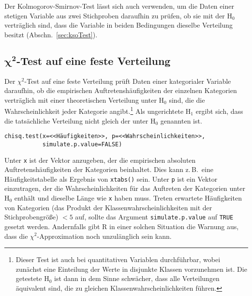 Der Kolmogorov-Smirnov-Test lässt sich auch verwenden, um die Daten einer stetigen Variable aus zwei Stichproben daraufhin zu prüfen, ob sie mit der $\text{H}_{0}$ verträglich sind, dass die Variable in beiden Bedingungen dieselbe Verteilung besitzt (Abschn.\ \ref{sec:ksoTest}).

\subsection[\texorpdfstring{$\chi^{2}$}{chi2}-Test auf eine feste Verteilung]{$\bm{\chi^{2}}$-Test auf eine feste Verteilung}

Der $\chi^{2}$-Test auf eine feste Verteilung prüft Daten einer kategorialer Variable daraufhin, ob die empirischen Auftretenshäufigkeiten der einzelnen Kategorien verträglich mit einer theoretischen Verteilung unter $\text{H}_{0}$ sind, die die Wahrscheinlichkeit jeder Kategorie angibt.\footnote{Dieser Test ist auch bei quantitativen Variablen durchführbar, wobei zunächst eine Einteilung der Werte in disjunkte Klassen vorzunehmen ist. Die getestete $\text{H}_{0}$ ist dann in dem Sinne schwächer, dass alle Verteilungen äquivalent sind, die zu gleichen Klassenwahrscheinlichkeiten führen.} Als ungerichtete $\text{H}_{1}$ ergibt sich, dass die tatsächliche Verteilung nicht gleich der unter $\text{H}_{0}$ genannten ist.
\begin{lstlisting}
chisq.test(x=<<Häufigkeiten>>, p=<<Wahrscheinlichkeiten>>,
           simulate.p.value=FALSE)
\end{lstlisting}

Unter \lstinline!x! ist der Vektor anzugeben, der die empirischen absoluten Auftretenshäufigkeiten der Kategorien beinhaltet. Dies kann z.\,B.\ eine Häufigkeitstabelle als Ergebnis von \lstinline!xtabs()! sein. Unter \lstinline!p! ist ein Vektor einzutragen, der die Wahrscheinlichkeiten für das Auftreten der Kategorien unter $\text{H}_{0}$ enthält und dieselbe Länge wie \lstinline!x! haben muss. Treten erwartete Häufigkeiten von Kategorien (das Produkt der Klassenwahrscheinlichkeiten mit der Stichprobengröße) $< 5$ auf, sollte das Argument \lstinline!simulate.p.value! auf \lstinline!TRUE! gesetzt werden. Andernfalls gibt R in einer solchen Situation die Warnung aus, dass die $\chi^{2}$-Approximation noch unzulänglich sein kann.

